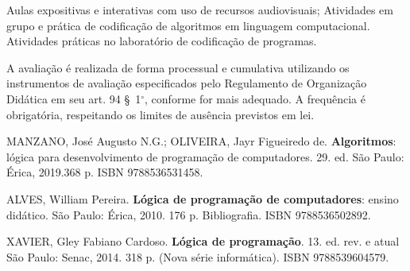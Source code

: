 \begin{pud}
	\metodologia            	
       Aulas expositivas e interativas com uso de recursos audiovisuais;
       Atividades em grupo e prática de codificação de algoritmos em linguagem computacional.
       Atividades práticas no laboratório de codificação de programas.
	
	
	\avaliacao	
	A avaliação é realizada de forma processual e cumulativa utilizando os instrumentos de avaliação especificados pelo Regulamento de Organização Didática em seu art. 94 \S~1$^\circ$, conforme for mais adequado. A frequência é obrigatória, respeitando os limites de ausência previstos em lei.
	\naopresencial
	
	\begin{bibbasica}
		\item MANZANO, José Augusto N.G.; OLIVEIRA, Jayr Figueiredo de. \textbf{Algoritmos}: lógica para desenvolvimento de programação de computadores. 29. ed. São Paulo: Érica, 2019.368 p. ISBN 9788536531458.
		\item ALVES, William Pereira. \textbf{Lógica de programação de computadores}: ensino didático. São Paulo: Érica, 2010. 176 p. Bibliografia. ISBN 9788536502892. 
	 	\item XAVIER, Gley Fabiano Cardoso. \textbf{Lógica de programação}. 13. ed. rev. e atual São Paulo: Senac, 2014. 318 p. (Nova série informática). ISBN 9788539604579.
	 	 
	\end{bibbasica}
	
	\begin{bibcomplementar}
	
	    	

\end{bibcomplementar}
\end{pud}
